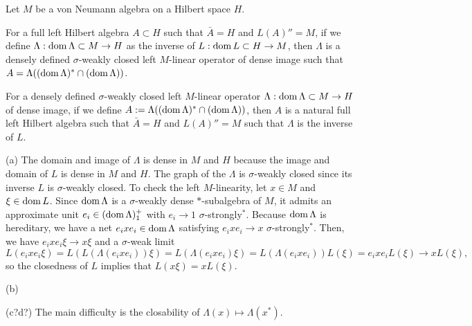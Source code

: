 \documentclass{../../large}
\begin{document}
\begin{prb}
Let $M$ be a von Neumann algebra on a Hilbert space $H$.

\begin{parts}
\item For a full left Hilbert algebra $A\subset H$ such that $\bar A=H$ and $L(A)''=M$, if we define $\Lambda:\operatorname{dom}\Lambda\subset M\to H$ as the inverse of $L:\operatorname{dom} L\subset H\to M$, then $\Lambda$ is a densely defined $\sigma$-weakly closed left $M$-linear operator of dense image such that $A=\Lambda((\operatorname{dom}\Lambda)^*\cap(\operatorname{dom}\Lambda))$.
\item For a densely defined $\sigma$-weakly closed left $M$-linear operator $\Lambda:\operatorname{dom}\Lambda\subset M\to H$ of dense image, if we define $A:=\Lambda((\operatorname{dom}\Lambda)^*\cap(\operatorname{dom}\Lambda))$, then $A$ is a natural full left Hilbert algebra such that $\bar A=H$ and $L(A)''=M$ such that $\Lambda$ is the inverse of $L$.
\end{parts}
\end{prb}
\begin{pf}
(a)
The domain and image of $\Lambda$ is dense in $M$ and $H$ because the image and domain of $L$ is dense in $M$ and $H$.
The graph of the $\Lambda$ is $\sigma$-weakly closed since its inverse $L$ is $\sigma$-weakly closed.
To check the left $M$-linearity, let $x\in M$ and $\xi\in\operatorname{dom} L$.
Since $\operatorname{dom}\Lambda$ is a $\sigma$-weakly dense $*$-subalgebra of $M$, it admits an approximate unit $e_i\in(\operatorname{dom}\Lambda)_1^+$ with $e_i\to1$ $\sigma$-strongly$^*$.
Because $\operatorname{dom}\Lambda$ is hereditary, we have a net $e_ixe_i\in\operatorname{dom}\Lambda$ satisfying $e_ixe_i\to x$ $\sigma$-strongly$^*$.
Then, we have $e_ixe_i\xi\to x\xi$ and a $\sigma$-weak limit
\[L(e_ixe_i\xi)=L(L(\Lambda(e_ixe_i))\xi)=L(\Lambda(e_ixe_i)\xi)=L(\Lambda(e_ixe_i))L(\xi)=e_ixe_iL(\xi)\to xL(\xi),\]
so the closedness of $L$ implies that $L(x\xi)=xL(\xi)$.

(b)



(c?d?)
The main difficulty is the closability of $\Lambda(x)\mapsto\Lambda(x^*)$.


\end{pf}


\begin{prb}
\end{prb}

\begin{prb}
\end{prb}
\end{document}
